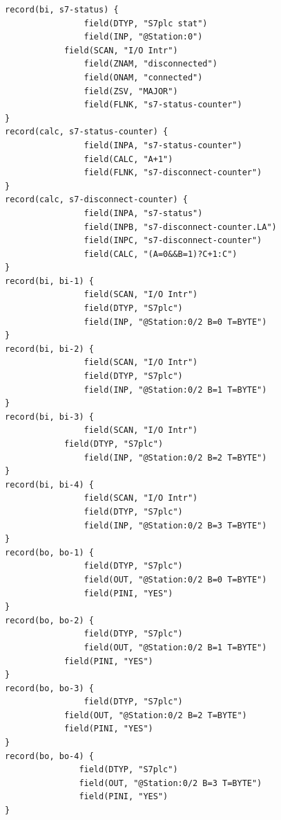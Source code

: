 \documentclass[11pt
  , a4paper
  , article
  , oneside
]{memoir}
\begin{document}
\begin{lstlisting}[style=termstyle]
record(bi, s7-status) {
	        	field(DTYP, "S7plc stat")
		        field(INP, "@Station:0")
			field(SCAN, "I/O Intr")
		        field(ZNAM, "disconnected")
		        field(ONAM, "connected")
		        field(ZSV, "MAJOR")
		        field(FLNK, "s7-status-counter")
}
record(calc, s7-status-counter) {
		        field(INPA, "s7-status-counter")
	  	        field(CALC, "A+1")
		        field(FLNK, "s7-disconnect-counter")
}
record(calc, s7-disconnect-counter) {
		        field(INPA, "s7-status")
		        field(INPB, "s7-disconnect-counter.LA")
		        field(INPC, "s7-disconnect-counter")
		        field(CALC, "(A=0&&B=1)?C+1:C")
}
record(bi, bi-1) {
		        field(SCAN, "I/O Intr")
		        field(DTYP, "S7plc")
		        field(INP, "@Station:0/2 B=0 T=BYTE")
}
record(bi, bi-2) {
		        field(SCAN, "I/O Intr")
		        field(DTYP, "S7plc")
		        field(INP, "@Station:0/2 B=1 T=BYTE")
}
record(bi, bi-3) {
	        	field(SCAN, "I/O Intr")
			field(DTYP, "S7plc")
		        field(INP, "@Station:0/2 B=2 T=BYTE")
}
record(bi, bi-4) {
		        field(SCAN, "I/O Intr")
		        field(DTYP, "S7plc")
		        field(INP, "@Station:0/2 B=3 T=BYTE")
}
record(bo, bo-1) {
		        field(DTYP, "S7plc")
		        field(OUT, "@Station:0/2 B=0 T=BYTE")
		        field(PINI, "YES")
}
record(bo, bo-2) {
		        field(DTYP, "S7plc")
		        field(OUT, "@Station:0/2 B=1 T=BYTE")
			field(PINI, "YES")
}
record(bo, bo-3) {
	        	field(DTYP, "S7plc")
			field(OUT, "@Station:0/2 B=2 T=BYTE")
			field(PINI, "YES")
}
record(bo, bo-4) {
		       field(DTYP, "S7plc")
		       field(OUT, "@Station:0/2 B=3 T=BYTE")
		       field(PINI, "YES")
}

\end{lstlisting}
\end{document}
